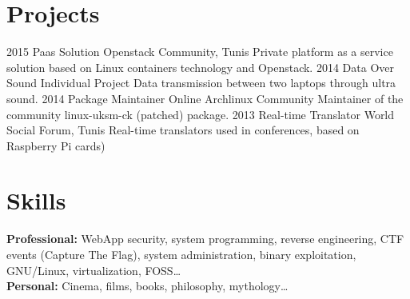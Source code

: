 \documentclass[]{friggeri-cv}
\begin{document}
\section{Projects}

\begin{entrylist}
\entry
{2015}
{Paas Solution}
{Openstack Community, Tunis}
{Private platform as a service solution based on Linux containers technology and Openstack.}
\entry
{2014}
{Data Over Sound}
{Individual Project}
{Data transmission between two laptops through ultra sound.}
\entry
{2014}
{Package Maintainer}
{Online Archlinux Community}
{Maintainer of the community linux-uksm-ck (patched) package.}
\entry
{2013}
{Real-time Translator}
{World Social Forum, Tunis}
{Real-time translators used in conferences, based on Raspberry Pi cards)}
\end{entrylist}




\section{Skills}

\textbf{Professional:} WebApp security, system programming, reverse engineering, CTF events (Capture The Flag), system administration, binary exploitation, GNU/Linux, virtualization, FOSS\ldots\\
\textbf{Personal:} Cinema, films, books, philosophy, mythology\ldots


\end{document}
